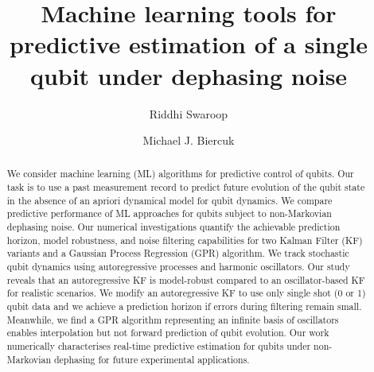 \documentclass[pra, reprint]{revtex4-1}
\begin{document}
\title{Machine learning tools for predictive estimation of a single qubit under dephasing noise}

\author{Riddhi Swaroop} 

\author{Michael J. Biercuk}

\begin{abstract}
We consider machine learning (ML) algorithms for predictive control of qubits. Our task is to use a past measurement record to predict future evolution of the qubit state in the absence of an apriori dynamical model for qubit dynamics. We compare predictive performance of ML approaches for qubits subject to non-Markovian dephasing noise. Our numerical investigations quantify the achievable prediction horizon, model robustness, and noise filtering capabilities for two Kalman Filter (KF) variants and a Gaussian Process Regression (GPR) algorithm. We track stochastic qubit dynamics using autoregressive processes and harmonic oscillators. Our study reveals that an autoregressive KF is model-robust compared to an oscillator-based KF for realistic scenarios. We modify an autoregressive KF to use only single shot (0 or 1) qubit data and we achieve a prediction horizon if errors during filtering remain small. Meanwhile, we find a GPR algorithm representing an infinite basis of oscillators enables interpolation but not forward prediction of qubit evolution. Our work numerically characterises real-time predictive estimation for qubits under non-Markovian dephasing for future experimental applications.
\end{abstract}



\maketitle

% 

% 

\appendix
\begin{widetext}
  
\end{widetext}

 
\end{document}

